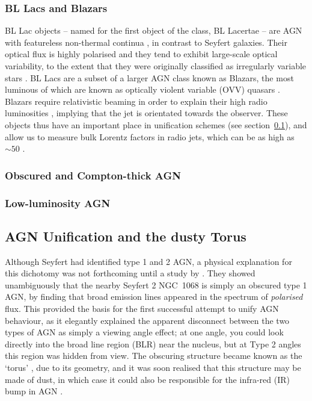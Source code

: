 \subsubsection{BL Lacs and Blazars}

BL Lac objects -- named for the first object of the class, BL Lacertae --
are AGN with featureless non-thermal continua 
\citep[see figure~\ref{fig:agn_templates}, and][for a review]{falomo2014},
in contrast to Seyfert galaxies. 
Their optical flux is highly polarised \citep{angelstockman1980}
and they tend to exhibit large-scale optical variability, 
to the extent that they were originally classified as irregularly variable
stars \citep{hoff1929}. BL Lacs are a subset of 
a larger AGN class known as Blazars, the most luminous of which
are known as optically violent variable (OVV) quasars \citep{wright1998}. 
Blazars require relativistic beaming in order to explain their high 
radio luminosities \citep{ghis1985,ghis1993}, 
implying that the jet is orientated towards
the observer. These objects thus have an important place in unification
schemes (see section~\ref{agn_unification}), and
allow us to measure bulk Lorentz factors in radio jets, which
can be as high as $\sim50$ \citep{begelman2008}.

\subsubsection{Obscured and Compton-thick AGN}

\subsubsection{Low-luminosity AGN}


\subsection{AGN Unification and the dusty Torus}
\label{agn_unification}

Although Seyfert had identified type 1 and 2 AGN, a physical explanation
for this dichotomy was not forthcoming until a study by \cite[][AM85]{antonucci1985}.
They showed unambiguously that the nearby Seyfert 2 NGC~1068 is simply an obscured
type 1 AGN, by finding that broad emission lines appeared in the spectrum of
{\em polarised} flux. This provided the basis for the first successful attempt
to unify AGN behaviour, as it elegantly 
explained the apparent disconnect between the two types of 
AGN as simply a viewing angle effect; at one angle, you could look directly
into the broad line region (BLR) near the nucleus, but at Type 2 angles
this region was hidden from view.
The obscuring structure became known as the `torus' \citep{krolik1986}, 
due to its geometry, and it was soon realised that this structure
may be made of dust, in which case it could also be responsible for the infra-red (IR)
bump in AGN \citep{neugebauer1979}.

